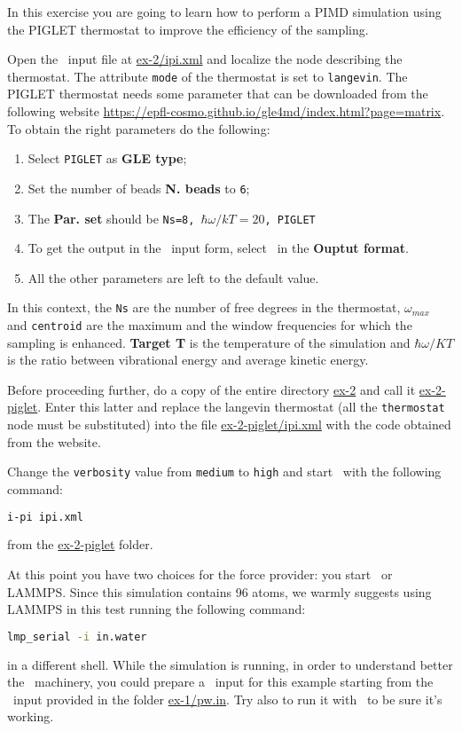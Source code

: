 \documentclass{article}
\begin{document}
\begin{Exercise}[label={inputs},title={Liquid water with the
    \emph{PIGLET} thermostat}]
In this exercise you are going to learn how to perform a PIMD
simulation using the PIGLET thermostat to improve the efficiency of
the sampling.

\Question
Open the \ipi\ input file at \url{ex-2/ipi.xml} and localize the node
describing the thermostat. The attribute \texttt{mode} of the
thermostat is set to \texttt{langevin}. The PIGLET thermostat needs
some parameter that can be downloaded from the following website
\url{https://epfl-cosmo.github.io/gle4md/index.html?page=matrix}. 
To obtain the right parameters do the following:
\begin{enumerate}
\item Select \texttt{PIGLET} as \textbf{GLE type};
\item Set the number of beads \textbf{N. beads} to \texttt{6};
\item The \textbf{Par. set} should be \texttt{Ns=8,
    $\hbar\omega/kT=20$, PIGLET}
\item To get the output in the \ipi\ input form, select \ipi\ in the
  \textbf{Ouptut format}.
\item All the other parameters are left to the default value.
\end{enumerate}
In this context, the \texttt{Ns} are the number of free degrees in the
thermostat, $\omega_{max}$ and \texttt{centroid} are the maximum
and the window frequencies for which the sampling is
enhanced. \textbf{Target T} is the temperature of the simulation and
$\hbar\omega/KT$ is the ratio between vibrational energy and average
kinetic energy.

Before proceeding further, do a copy of the entire directory
\url{ex-2} and call it \url{ex-2-piglet}. Enter this latter and
replace the langevin thermostat (all the \texttt{thermostat} node must
be substituted) into the file \url{ex-2-piglet/ipi.xml} with the code
obtained from the website.

\Question
Change the \texttt{verbosity} value from \texttt{medium} to
\texttt{high} and start \ipi\ with the following command:
\begin{lstlisting}[language=bash]
i-pi ipi.xml
\end{lstlisting}
from the \url{ex-2-piglet} folder. 

At this point you have two choices for the force provider: you start
\PWscf\ or LAMMPS. Since this simulation contains 96 atoms, we warmly
suggests using LAMMPS in this test running the following command:
\begin{lstlisting}[language=bash]
lmp_serial -i in.water 
\end{lstlisting}
in a different shell. While the simulation is running, in order to
understand better the \ipi\ machinery, you could prepare a \pwx\ input
for this example starting from the \pwx\ input provided in the folder
\url{ex-1/pw.in}. Try also to run it with \ipi\ to be sure it's working.


\end{Exercise}
\end{document}
